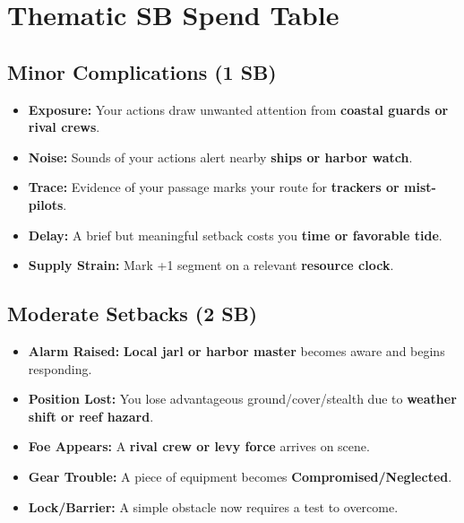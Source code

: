    \section*{Thematic SB Spend Table}
    \label{sec:linn-sb}
    
    \subsection*{Minor Complications (1 SB)}
    \begin{itemize}
    \item \textbf{Exposure:} Your actions draw unwanted attention from \textbf{coastal guards or rival crews}.
    \item \textbf{Noise:} Sounds of your actions alert nearby \textbf{ships or harbor watch}.
    \item \textbf{Trace:} Evidence of your passage marks your route for \textbf{trackers or mist-pilots}.
    \item \textbf{Delay:} A brief but meaningful setback costs you \textbf{time or favorable tide}.
    \item \textbf{Supply Strain:} Mark +1 segment on a relevant \textbf{resource clock}.
    \end{itemize}
    
    \subsection*{Moderate Setbacks (2 SB)}
    \begin{itemize}
    \item \textbf{Alarm Raised:} \textbf{Local jarl or harbor master} becomes aware and begins responding.
    \item \textbf{Position Lost:} You lose advantageous ground/cover/stealth due to \textbf{weather shift or reef hazard}.
    \item \textbf{Foe Appears:} A \textbf{rival crew or levy force} arrives on scene.
    \item \textbf{Gear Trouble:} A piece of equipment becomes \textbf{Compromised/Neglected}.
    \item \textbf{Lock/Barrier:} A simple obstacle now requires a test to overcome.
    \end{itemize}
    
